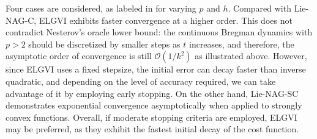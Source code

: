 \documentclass[letterpaper, 10pt, conference]{ieeeconf}
\begin{document}
Four cases are considered, as labeled in  for varying $p$ and $h$.
Compared with Lie-NAG-C, ELGVI exhibits faster convergence at a higher order. 
This does not contradict Nesterov's oracle lower bound: the continuous Bregman dynamics with $p>2$ should be discretized by smaller steps as $t$ increases, and therefore, the asymptotic order of convergence is still $\mathcal{O}(1/k^2)$ as illustrated above.
However, since ELGVI uses a fixed stepsize, the initial error can decay faster than inverse quadratic, and depending on the level of accuracy required, we can take advantage of it by employing early stopping.
On the other hand, Lie-NAG-SC demonstrates exponential convergence asymptotically when applied to strongly convex functions. 
Overall, if  moderate stopping criteria are employed, ELGVI may be preferred, as they exhibit the fastest initial decay of the cost function.
\end{document}
